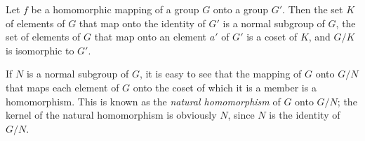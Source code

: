 \begin{theorem}
Let $f$ be a homomorphic mapping of a group $G$ onto a group $G'$. Then the set $K$ of elements of $G$ that map onto the identity of $G'$ is a normal subgroup of $G$, the set of elements of $G$ that map onto an element $a'$ of $G'$ is a coset of $K$, and $G/K$ is isomorphic to $G'$.

If $N$ is a normal subgroup of $G$, it is easy to see that the mapping of $G$ onto $G/N$ that maps each element of $G$ onto the coset of which it is a member is a homomorphism. This is known as the \emph{natural homomorphism} of $G$ onto $G/N$; the kernel of the natural homomorphism is obviously $N$, since $N$ is the identity of $G/N$.
\end{theorem}

\endinput